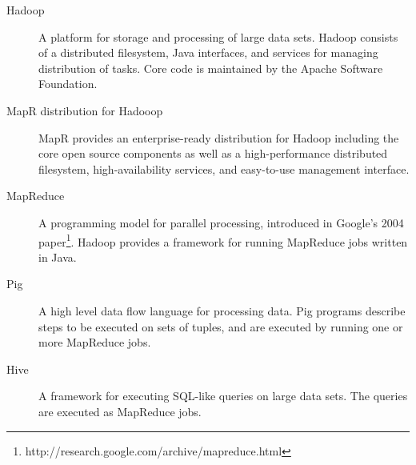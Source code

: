 \documentclass[10pt,letterpaper]{article}
\begin{document}
\begin{description}
\item[Hadoop] A platform for storage and processing of large data sets. Hadoop consists of a distributed filesystem, Java interfaces, and services for managing distribution of tasks. Core code is maintained by the Apache Software Foundation.
\item[MapR distribution for Hadooop] MapR provides an enterprise-ready distribution for Hadoop including the core open source components as well as a high-performance distributed filesystem, high-availability services, and easy-to-use management interface.
\item[MapReduce] A programming model for parallel processing, introduced in Google's 2004 paper\footnote{http://research.google.com/archive/mapreduce.html}. Hadoop provides a framework for running MapReduce jobs written in Java.
\item[Pig] A high level data flow language for processing data. Pig programs describe steps to be executed on sets of tuples, and are executed by running one or more MapReduce jobs.
\item[Hive] A framework for executing SQL-like queries on large data sets. The queries are executed as MapReduce jobs.
\end{description}
\end{document}
